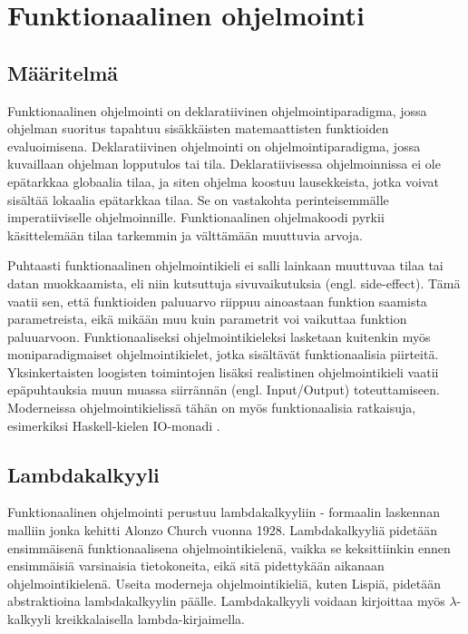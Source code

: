 \chapter{Funktionaalinen ohjelmointi} \label{Funktionaalinen ohjelmointi}

\section{Määritelmä}
Funktionaalinen ohjelmointi on deklaratiivinen ohjelmointiparadigma, jossa ohjelman suoritus tapahtuu sisäkkäisten
matemaattisten funktioiden evaluoimisena. Deklaratiivinen ohjelmointi on ohjelmointiparadigma, jossa kuvaillaan ohjelman
lopputulos tai tila. Deklaratiivisessa ohjelmoinnissa ei ole epätarkkaa globaalia tilaa, ja siten ohjelma koostuu
lausekkeista, jotka voivat sisältää lokaalia epätarkkaa tilaa. Se on vastakohta perinteisemmälle imperatiiviselle 
ohjelmoinnille. Funktionaalinen ohjelmakoodi pyrkii käsittelemään tilaa tarkemmin ja välttämään muuttuvia
arvoja. \cite{hudak}

Puhtaasti funktionaalinen ohjelmointikieli ei salli lainkaan muuttuvaa tilaa tai datan muokkaamista, eli niin kutsuttuja
sivuvaikutuksia (engl. side-effect). Tämä vaatii sen, että funktioiden paluuarvo riippuu ainoastaan funktion saamista
parametreista, eikä mikään muu kuin parametrit voi vaikuttaa funktion paluuarvoon. Funktionaaliseksi ohjelmointikieleksi
lasketaan kuitenkin myös moniparadigmaiset ohjelmointikielet, jotka sisältävät funktionaalisia piirteitä.
Yksinkertaisten loogisten toimintojen lisäksi realistinen ohjelmointikieli vaatii epäpuhtauksia muun muassa siirrännän
(engl. Input/Output) toteuttamiseen. \cite{purelyFunctional} Moderneissa ohjelmointikielissä tähän on myös
funktionaalisia ratkaisuja, esimerkiksi Haskell-kielen IO-monadi \cite{learnhaskell}.

\section{Lambdakalkyyli}
Funktionaalinen ohjelmointi perustuu lambdakalkyyliin - formaalin laskennan malliin jonka kehitti Alonzo Church vuonna
1928. Lambdakalkyyliä pidetään ensimmäisenä funktionaalisena ohjelmointikielenä, vaikka se keksittiinkin ennen
ensimmäisiä varsinaisia tietokoneita, eikä sitä pidettykään aikanaan ohjelmointikielenä. Useita moderneja
ohjelmointikieliä, kuten Lispiä, pidetään abstraktioina lambdakalkyylin päälle. Lambdakalkyyli voidaan kirjoittaa myös
$ \lambda $-kalkyyli kreikkalaisella lambda-kirjaimella. \cite{hudak}

